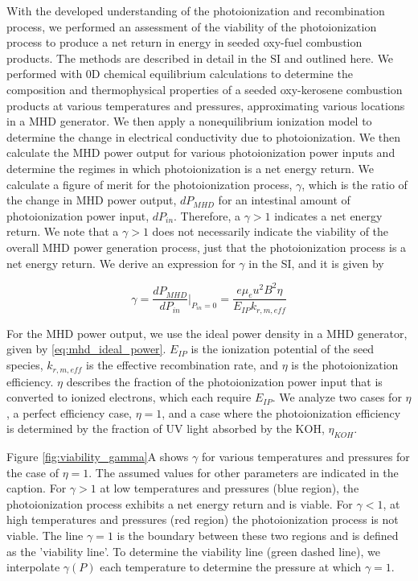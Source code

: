 With the developed understanding of the photoionization and recombination process, we performed an assessment of the viability of the photoionization process to produce a net return in energy in seeded oxy-fuel combustion products. The methods are described in detail in the SI and outlined here. We performed with 0D chemical equilibrium calculations to determine the composition and thermophysical properties of a seeded oxy-kerosene combustion products at various temperatures and pressures, approximating various locations in a MHD generator. We then apply a nonequilibrium ionization model to determine the change in electrical conductivity due to photoionization. We then calculate the MHD power output for various photoionization power inputs and determine the regimes in which photoionization is a net energy return. We calculate a figure of merit for the photoionization process, $\gamma$, which is the ratio of the change in MHD power output, $dP_{MHD}$ for an intestinal amount of photoionization power input, $dP_{in}$. Therefore, a $\gamma > 1$ indicates a net energy return. We note that a $\gamma > 1$ does not necessarily indicate the viability of the overall MHD power generation process, just that the photoionization process is a net energy return. We derive an expression for $\gamma$ in the SI, and it is given by


\begin{equation}
\gamma = \frac{dP_{MHD}}{dP_{in}} \Big|_{P_{in}=0} = \frac{e \mu_e u^2 B^2 \eta}{E_{IP}k_{r, m, eff}} 
\end{equation}


For the MHD power output, we use the ideal power density in a MHD generator, given by \ref{eq:mhd_ideal_power}. $E_{IP}$ is the ionization potential of the seed species, $k_{r, m, eff}$ is the effective recombination rate, and $\eta$ is the photoionization efficiency. $\eta$ describes the fraction of the photoionization power input that is converted to ionized electrons, which each require $E_{IP}$. We analyze two cases for $\eta$, a perfect efficiency case, $\eta=1$, and a case where the photoionization efficiency is determined by the fraction of UV light absorbed by the KOH, $\eta_{KOH}$. 

Figure \ref{fig:viability_gamma}A shows $\gamma$ for various temperatures and pressures for the case of $\eta=1$. The assumed values for other parameters are indicated in the caption.  For $\gamma > 1$ at low temperatures and pressures (blue region), the photoionization process exhibits a net energy return and is viable. For $\gamma < 1$, at high temperatures and pressures (red region) the photoionization process is not viable. The line $\gamma = 1$ is the boundary between these two regions and is defined as the 'viability line'. To determine the viability line (green dashed line), we interpolate $\gamma (P)$ each temperature to determine the pressure at which $\gamma = 1$. 

